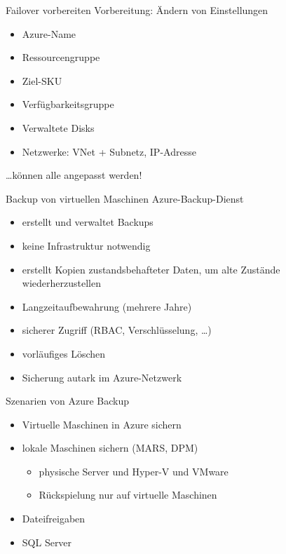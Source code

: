 \begin{flashcard}[Definition]{Failover vorbereiten}
    Vorbereitung: Ändern von Einstellungen
    \begin{itemize}
        \item Azure-Name
        \item Ressourcengruppe
        \item Ziel-SKU
        \item Verfügbarkeitsgruppe
        \item Verwaltete Disks
        \item Netzwerke: VNet + Subnetz, IP-Adresse
    \end{itemize}
    \ldots können alle angepasst werden!
\end{flashcard}

\begin{flashcard}[Definition]{Backup von virtuellen Maschinen}
    Azure-Backup-Dienst
    \begin{itemize}
        \item erstellt und verwaltet Backups
        \item keine Infrastruktur notwendig
        \item erstellt Kopien zustandsbehafteter Daten, um alte Zustände wiederherzustellen
        \item Langzeitaufbewahrung (mehrere Jahre)
        \item sicherer Zugriff (RBAC, Verschlüsselung, \ldots)
        \item vorläufiges Löschen
        \item Sicherung autark im Azure-Netzwerk
    \end{itemize}
\end{flashcard}

\begin{flashcard}[Definition]{Szenarien von Azure Backup}
    \begin{itemize}
        \item Virtuelle Maschinen in Azure sichern
        \item lokale Maschinen sichern (MARS, DPM)
            \begin{itemize}
                \item physische Server und Hyper-V und VMware
                \item Rückspielung nur auf virtuelle Maschinen
            \end{itemize}
        \item Dateifreigaben
        \item SQL Server
    \end{itemize}
\end{flashcard}

